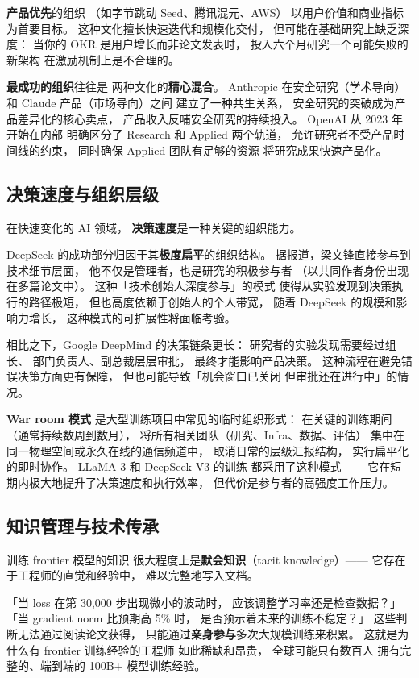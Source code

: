\textbf{产品优先}的组织
（如字节跳动 Seed、腾讯混元、AWS）
以用户价值和商业指标为首要目标。
这种文化擅长快速迭代和规模化交付，
但可能在基础研究上缺乏深度：
当你的 OKR 是用户增长而非论文发表时，
投入六个月研究一个可能失败的新架构
在激励机制上是不合理的。

\textbf{最成功的组织}往往是
两种文化的\textbf{精心混合}。
Anthropic 在安全研究（学术导向）
和 Claude 产品（市场导向）之间
建立了一种共生关系，
安全研究的突破成为产品差异化的核心卖点，
产品收入反哺安全研究的持续投入。
OpenAI 从 2023 年开始在内部
明确区分了 Research 和 Applied 两个轨道，
允许研究者不受产品时间线的约束，
同时确保 Applied 团队有足够的资源
将研究成果快速产品化。

\subsection{决策速度与组织层级}

在快速变化的 AI 领域，
\textbf{决策速度}是一种关键的组织能力。

DeepSeek 的成功部分归因于其\textbf{极度扁平}的组织结构。
据报道，梁文锋直接参与到技术细节层面，
他不仅是管理者，也是研究的积极参与者
（以共同作者身份出现在多篇论文中）。
这种「技术创始人深度参与」的模式
使得从实验发现到决策执行的路径极短，
但也高度依赖于创始人的个人带宽，
随着 DeepSeek 的规模和影响力增长，
这种模式的可扩展性将面临考验。

相比之下，Google DeepMind 的决策链条更长：
研究者的实验发现需要经过组长、
部门负责人、副总裁层层审批，
最终才能影响产品决策。
这种流程在避免错误决策方面更有保障，
但也可能导致「机会窗口已关闭
但审批还在进行中」的情况。

\textbf{War room 模式}
是大型训练项目中常见的临时组织形式：
在关键的训练期间（通常持续数周到数月），
将所有相关团队（研究、Infra、数据、评估）
集中在同一物理空间或永久在线的通信频道中，
取消日常的层级汇报结构，
实行扁平化的即时协作。
LLaMA 3 和 DeepSeek-V3 的训练
都采用了这种模式——
它在短期内极大地提升了决策速度和执行效率，
但代价是参与者的高强度工作压力。

\subsection{知识管理与技术传承}

训练 frontier 模型的知识
很大程度上是\textbf{默会知识}（tacit knowledge）——
它存在于工程师的直觉和经验中，
难以完整地写入文档。

「当 loss 在第 30,000 步出现微小的波动时，
应该调整学习率还是检查数据？」
「当 gradient norm 比预期高 5\% 时，
是否预示着未来的训练不稳定？」
这些判断无法通过阅读论文获得，
只能通过\textbf{亲身参与}多次大规模训练来积累。
这就是为什么有 frontier 训练经验的工程师
如此稀缺和昂贵，
全球可能只有数百人
拥有完整的、端到端的 100B+ 模型训练经验。

